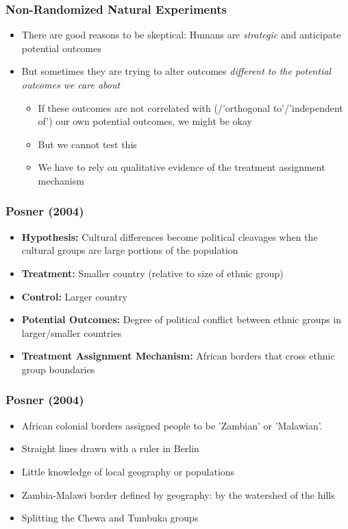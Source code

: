 \documentclass[xcolor=x11names,compress]{beamer}\usepackage[]{graphicx}\usepackage[]{color}
\renewcommand{\(}{\begin{columns}}
\renewcommand{\)}{\end{columns}}
\newcommand{\<}[1]{\begin{column}{#1}}
\renewcommand{\>}{\end{column}}
\begin{document}
\begin{frame}
\frametitle{Non-Randomized Natural Experiments}
\begin{itemize}
\item There are good reasons to be skeptical: Humans are \textit{strategic} and anticipate potential outcomes 
\pause
\item But sometimes they are trying to alter outcomes \textit{different to the potential outcomes we care about}
\pause
\begin{itemize}
\item If these outcomes are not correlated with (/'orthogonal to'/'independent of') our own potential outcomes, we might be okay
\pause
\item But we cannot test this
\pause
\item We have to rely on qualitative evidence of the treatment assignment mechanism
\end{itemize}
\end{itemize}
\end{frame}

\begin{frame}
\frametitle{Posner (2004)}
\begin{itemize}
\item \textbf{Hypothesis:} Cultural differences become political cleavages when the cultural groups are large portions of the population
\pause
\item \textbf{Treatment: } Smaller country (relative to size of ethnic group)
\pause
\item \textbf{Control: } Larger country
\pause
\item \textbf{Potential Outcomes:} Degree of political conflict between ethnic groups in larger/smaller countries
\pause
\item \textbf{Treatment Assignment Mechanism:} African borders that cross ethnic group boundaries
\end{itemize}
\end{frame}

\begin{frame}
\frametitle{Posner (2004)}
\begin{itemize}
\item African colonial borders assigned people to be 'Zambian' or 'Malawian'. 
\pause
\item Straight lines drawn with a ruler in Berlin
\pause
\item Little knowledge of local geography or populations
\pause
\item Zambia-Malawi border defined by geography: by the watershed of the hills
\pause
\item Splitting the Chewa and Tumbuka groups
\end{itemize}
\end{frame}
\end{document}
